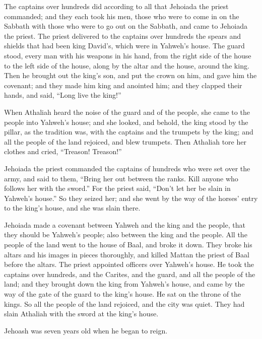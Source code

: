  The captains over hundreds did according to all that
Jehoiada the priest commanded; and they each took his men, those who
were to come in on the Sabbath with those who were to go out on the
Sabbath, and came to Jehoiada the priest.  The priest
delivered to the captains over hundreds the spears and shields that had
been king David's, which were in Yahweh's house.  The
guard stood, every man with his weapons in his hand, from the right side
of the house to the left side of the house, along by the altar and the
house, around the king.  Then he brought out the king's
son, and put the crown on him, and gave him the covenant; and they made
him king and anointed him; and they clapped their hands, and said,
``Long live the king!''

 When Athaliah heard the noise of the guard and of the
people, she came to the people into Yahweh's house;  and
she looked, and behold, the king stood by the pillar, as the tradition
was, with the captains and the trumpets by the king; and all the people
of the land rejoiced, and blew trumpets. Then Athaliah tore her clothes
and cried, ``Treason! Treason!''

 Jehoiada the priest commanded the captains of hundreds
who were set over the army, and said to them, ``Bring her out between
the ranks. Kill anyone who follows her with the sword.'' For the priest
said, ``Don't let her be slain in Yahweh's house.''  So
they seized her; and she went by the way of the horses' entry to the
king's house, and she was slain there.

 Jehoiada made a covenant between Yahweh and the king and
the people, that they should be Yahweh's people; also between the king
and the people.  All the people of the land went to the
house of Baal, and broke it down. They broke his altars and his images
in pieces thoroughly, and killed Mattan the priest of Baal before the
altars. The priest appointed officers over Yahweh's house.
 He took the captains over hundreds, and the Carites, and
the guard, and all the people of the land; and they brought down the
king from Yahweh's house, and came by the way of the gate of the guard
to the king's house. He sat on the throne of the kings. 
So all the people of the land rejoiced, and the city was quiet. They had
slain Athaliah with the sword at the king's house.

 Jehoash was seven years old when he began to reign.

